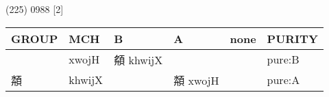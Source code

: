 \documentclass[14pt,a4paper]{scrartcl}
\begin{document}
(225) 0988 {[}2{]}

\begin{longtable}[c]{@{}llllll@{}}
\toprule
\begin{minipage}[b]{0.14\columnwidth}\raggedright\strut
GROUP
\strut\end{minipage} &
\begin{minipage}[b]{0.14\columnwidth}\raggedright\strut
MCH
\strut\end{minipage} &
\begin{minipage}[b]{0.14\columnwidth}\raggedright\strut
B
\strut\end{minipage} &
\begin{minipage}[b]{0.14\columnwidth}\raggedright\strut
A
\strut\end{minipage} &
\begin{minipage}[b]{0.14\columnwidth}\raggedright\strut
none
\strut\end{minipage} &
\begin{minipage}[b]{0.14\columnwidth}\raggedright\strut
PURITY
\strut\end{minipage}\tabularnewline
\midrule
\endhead
\begin{minipage}[t]{0.14\columnwidth}\raggedright\strut
𢌳
\strut\end{minipage} &
\begin{minipage}[t]{0.14\columnwidth}\raggedright\strut
xwojH
\strut\end{minipage} &
\begin{minipage}[t]{0.14\columnwidth}\raggedright\strut
頯 khwijX
\strut\end{minipage} &
\begin{minipage}[t]{0.14\columnwidth}\raggedright\strut
\strut\end{minipage} &
\begin{minipage}[t]{0.14\columnwidth}\raggedright\strut
\strut\end{minipage} &
\begin{minipage}[t]{0.14\columnwidth}\raggedright\strut
pure:B
\strut\end{minipage}\tabularnewline
\begin{minipage}[t]{0.14\columnwidth}\raggedright\strut
頮
\strut\end{minipage} &
\begin{minipage}[t]{0.14\columnwidth}\raggedright\strut
khwijX
\strut\end{minipage} &
\begin{minipage}[t]{0.14\columnwidth}\raggedright\strut
\strut\end{minipage} &
\begin{minipage}[t]{0.14\columnwidth}\raggedright\strut
頮 xwojH
\strut\end{minipage} &
\begin{minipage}[t]{0.14\columnwidth}\raggedright\strut
\strut\end{minipage} &
\begin{minipage}[t]{0.14\columnwidth}\raggedright\strut
pure:A
\strut\end{minipage}\tabularnewline
\bottomrule
\end{longtable}
\end{document}
